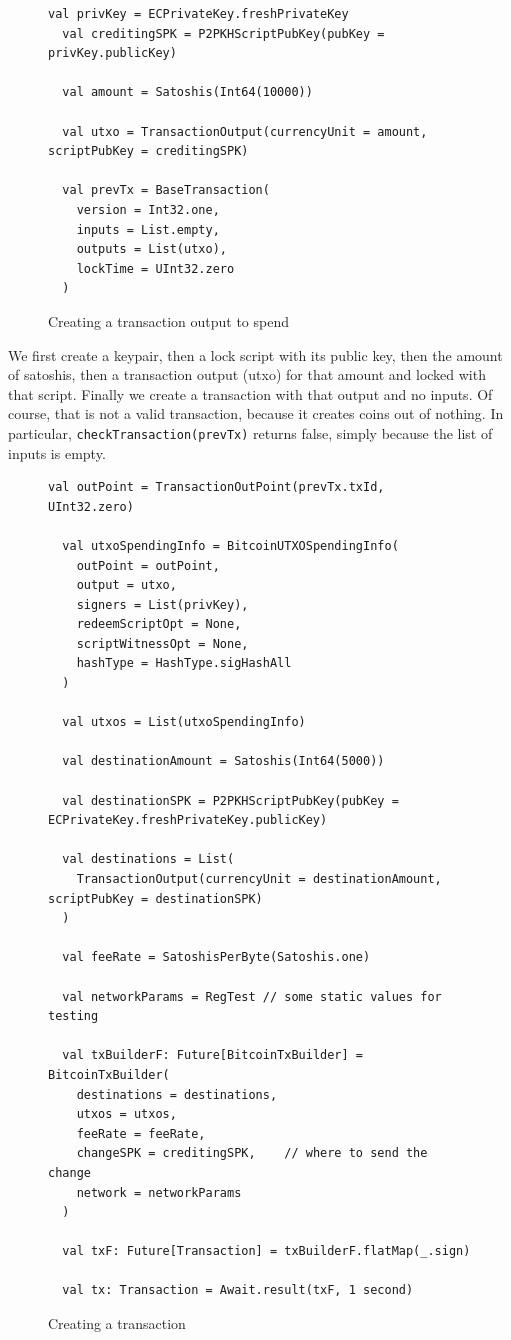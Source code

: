 \documentclass[runningheads]{llncs}
\begin{document}
\begin{figure}
\begin{lstlisting}[style=scala]
  val privKey = ECPrivateKey.freshPrivateKey
  val creditingSPK = P2PKHScriptPubKey(pubKey = privKey.publicKey)

  val amount = Satoshis(Int64(10000))

  val utxo = TransactionOutput(currencyUnit = amount, scriptPubKey = creditingSPK)

  val prevTx = BaseTransaction(
    version = Int32.one,
    inputs = List.empty,
    outputs = List(utxo),
    lockTime = UInt32.zero
  )
\end{lstlisting}
  
  \caption{Creating a transaction output to spend}
  \label{fig:prevtx}
\end{figure}

We first create a keypair, then a lock script with its public key,
then the amount of satoshis, then a transaction output (utxo) for that
amount and locked with that script. Finally we create a transaction
with that output and no inputs. Of course, that is not a valid
transaction, because it creates coins out of nothing. In particular,
\texttt{checkTransaction(prevTx)} returns false, simply because the list of
inputs is empty.

\begin{figure}
\begin{lstlisting}[style=scala]
  val outPoint = TransactionOutPoint(prevTx.txId, UInt32.zero)

  val utxoSpendingInfo = BitcoinUTXOSpendingInfo(
    outPoint = outPoint,
    output = utxo,
    signers = List(privKey),
    redeemScriptOpt = None,
    scriptWitnessOpt = None,
    hashType = HashType.sigHashAll
  )

  val utxos = List(utxoSpendingInfo)

  val destinationAmount = Satoshis(Int64(5000))

  val destinationSPK = P2PKHScriptPubKey(pubKey = ECPrivateKey.freshPrivateKey.publicKey)

  val destinations = List(
    TransactionOutput(currencyUnit = destinationAmount, scriptPubKey = destinationSPK)
  )

  val feeRate = SatoshisPerByte(Satoshis.one)

  val networkParams = RegTest // some static values for testing

  val txBuilderF: Future[BitcoinTxBuilder] = BitcoinTxBuilder(
    destinations = destinations, 
    utxos = utxos,               
    feeRate = feeRate,           
    changeSPK = creditingSPK,    // where to send the change
    network = networkParams      
  )

  val txF: Future[Transaction] = txBuilderF.flatMap(_.sign)

  val tx: Transaction = Await.result(txF, 1 second)
\end{lstlisting}
  \caption{Creating a transaction}
  \label{fig:tx}
\end{figure}
\end{document}
